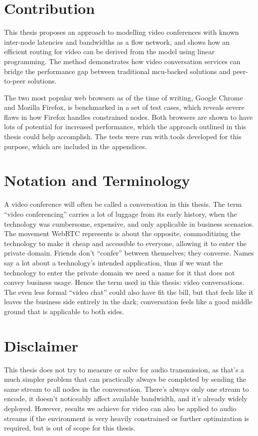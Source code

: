 \section{Contribution}

This thesis proposes an approach to modelling video conferences with known inter-node latencies and bandwidths as a flow network, and shows how an efficient routing for video can be derived from the model using linear programming. The method demonstrates how video conversation services can bridge the performance gap between traditional \gls{mcu}-backed solutions and peer-to-peer solutions.

The two most popular web browsers as of the time of writing, Google Chrome and Mozilla Firefox, is benchmarked in a set of test cases, which reveals severe flaws in how Firefox handles constrained nodes. Both browsers are shown to have lots of potential for increased performance, which the approach outlined in this thesis could help accomplish. The tests were run with tools developed for this purpose, which are included in the appendices.


\section{Notation and Terminology}

A video conference will often be called a conversation in this thesis. The term ``video conferencing'' carries a lot of luggage from its early history, when the technology was cumbersome, expensive, and only applicable in business scenarios. The movement WebRTC represents is about the opposite, commoditizing the technology to make it cheap and accessible to everyone, allowing it to enter the private domain. Friends don't ``confer'' between themselves; they converse. Names say a lot about a technology's intended application, thus if we want the technology to enter the private domain we need a name for it that does not convey business usage. Hence the term used in this thesis: video conversations. The even less formal ``video chat'' could also have fit the bill, but that feels like it leaves the business side entirely in the dark; conversation feels like a good middle ground that is applicable to both sides.


\section{Disclaimer}

This thesis does not try to measure or solve for audio transmission, as that's a much simpler problem that can practically always be completed by sending the same stream to all nodes in the conversation. There's always only one stream to encode, it doesn't noticeably affect available bandwidth, and it's already widely deployed. However, results we achieve for video can also be applied to audio streams if the environment is very heavily constrained or further optimization is required, but is out of scope for this thesis.
